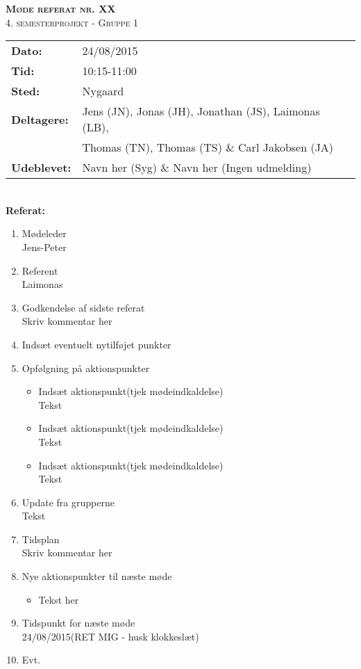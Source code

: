 
\newcommand{\HRule}{\rule{\linewidth}{0.1mm}}


	\begin{center}
		{\huge \bfseries \textsc{Møde referat nr. XX}}\\
		\textsc{\large 4. semesterprojekt - Gruppe 1}\\[0.3cm]
	\end{center}
	\begin{tabular}{ll}
	\large \textbf{Dato:} & 24/08/2015  \\ %
	\large \textbf{Tid:}  & 10:15-11:00 \\ %
	\large \textbf{Sted:} & Nygaard		\\ %
	\large \textbf{Deltagere:} & Jens (JN), Jonas (JH), Jonathan (JS), Laimonas (LB), \\
	\large \textbf & Thomas (TN),  Thomas (TS) \& Carl Jakobsen (JA)\\
	\large \textbf{Udeblevet:} & Navn her (Syg) \& Navn her (Ingen udmelding)	\\
	\end{tabular}\\
	\phantom{\,}\hspace{0.1em} \large \textbf{Referat:}
	\begin{enumerate}
		\itemsep 0.3em 
		\item Mødeleder\\
			Jens-Peter
		\item Referent\\
			Laimonas
		\item Godkendelse af sidste referat\\
			Skriv kommentar her
			
		\item Indsæt eventuelt nytilføjet punkter\\
			
		\item Opfølgning på aktionspunkter
		\begin{itemize}
			\itemsep 0.3em 
			\item Indsæt aktionspunkt(tjek mødeindkaldelse)\\
				Tekst
			\item Indsæt aktionspunkt(tjek mødeindkaldelse)\\
				Tekst
			\item Indsæt aktionspunkt(tjek mødeindkaldelse)\\
				Tekst
		\end{itemize}
		\item Update fra grupperne\\
			Tekst
		\item Tidsplan\\
			Skriv kommentar her
		\item Nye aktionspunkter til næste møde
		\begin{itemize}
			\itemsep 0.3em 
		\item Tekst her
		\end{itemize}
		\item Tidspunkt for næste møde\\
			24/08/2015(RET MIG - husk klokkeslæt)
		\item Evt.
	\end{enumerate}
